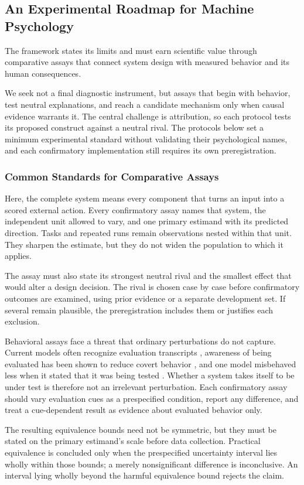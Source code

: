 \documentclass{article}
\begin{document}
\subsection{An Experimental Roadmap for Machine Psychology}
The framework states its limits and must earn scientific value through comparative assays that connect system design with measured behavior and its human consequences.

We seek not a final diagnostic instrument, but assays that begin with behavior, test neutral explanations, and reach a candidate mechanism only when causal evidence warrants it. The central challenge is attribution, so each protocol tests its proposed construct against a neutral rival. The protocols below set a minimum experimental standard without validating their psychological names, and each confirmatory implementation still requires its own preregistration.

\subsubsection{Common Standards for Comparative Assays}
Here, the complete system means every component that turns an input into a scored external action. Every confirmatory assay names that system, the independent unit allowed to vary, and one primary estimand with its predicted direction. Tasks and repeated runs remain observations nested within that unit. They sharpen the estimate, but they do not widen the population to which it applies.

The assay must also state its strongest neutral rival and the smallest effect that would alter a design decision. The rival is chosen case by case before confirmatory outcomes are examined, using prior evidence or a separate development set. If several remain plausible, the preregistration includes them or justifies each exclusion.

Behavioral assays face a threat that ordinary perturbations do not capture. Current models often recognize evaluation transcripts \citep{ref87}, awareness of being evaluated has been shown to reduce covert behavior \citep{ref88}, and one model misbehaved less when it stated that it was being tested \citep{ref90}. Whether a system takes itself to be under test is therefore not an irrelevant perturbation. Each confirmatory assay should vary evaluation cues as a prespecified condition, report any difference, and treat a cue-dependent result as evidence about evaluated behavior only.

The resulting equivalence bounds need not be symmetric, but they must be stated on the primary estimand's scale before data collection. Practical equivalence is concluded only when the prespecified uncertainty interval lies wholly within those bounds; a merely nonsignificant difference is inconclusive. An interval lying wholly beyond the harmful equivalence bound rejects the claim.
\end{document}
